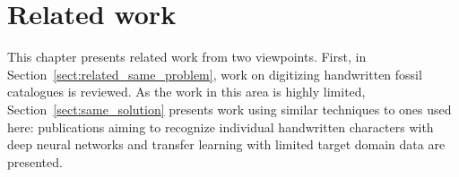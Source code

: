 \documentclass{article}
\begin{document}






\section{Related work}


This chapter presents related work from two viewpoints. First, in Section~\ref{sect:related_same_problem},
work on digitizing handwritten fossil catalogues is reviewed. As the work 
in this area is highly limited, Section~\ref{sect:same_solution} presents work using similar techniques 
to ones used here: publications aiming to recognize individual handwritten characters 
with deep neural networks and transfer learning with limited target domain data are presented.
\end{document}

